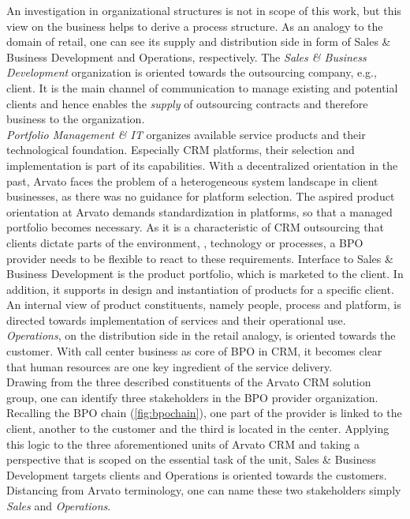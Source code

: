 An investigation in organizational structures is not in scope of this work, but this view on the business helps to derive a process structure. As an analogy to the domain of retail, one can see its supply and distribution side in form of Sales \& Business Development and Operations, respectively. The \textit{Sales \& Business Development }organization is oriented towards the outsourcing company, e.g., client. It is the main channel of communication to manage existing and potential clients and hence enables the \textit{supply} of outsourcing contracts and therefore business to the organization.\\
 \textit{Portfolio Management \& IT} organizes available service products and their technological foundation. Especially CRM platforms, their selection and implementation is part of its capabilities. With a decentralized orientation in the past, Arvato faces the problem of a heterogeneous system landscape in client businesses, as there was no guidance for platform selection. The aspired product orientation at Arvato demands standardization in platforms, so that a managed portfolio becomes necessary. As it is a characteristic of CRM outsourcing that clients dictate parts of the environment, \eg, technology or processes, a BPO provider needs to be flexible to react to these requirements. Interface to Sales \& Business Development is the product portfolio, which is marketed to the client. In addition, it supports in design and instantiation of products for a specific client. An internal view of product constituents, namely people, process and platform, is directed towards implementation of services and their operational use. 
  \textit{Operations}, on the distribution side in the retail analogy, is oriented towards the customer. With call center business as core of BPO in CRM, it becomes clear that human resources are one key ingredient of the service delivery.  \\
  
  Drawing from the three described constituents of the Arvato CRM solution group, one can identify three stakeholders in the BPO provider organization. Recalling the BPO chain (\Fig \ref{fig:bpochain}), one part of the provider is linked to the client, another to the customer and the third is located in the center. Applying this logic to the three aforementioned units of Arvato CRM and taking a perspective that is scoped on the essential task of the unit, Sales \& Business Development targets clients and Operations is oriented towards the customers. Distancing from Arvato terminology, one can name these two stakeholders simply \textit{Sales} and \textit{Operations}. \\
  
